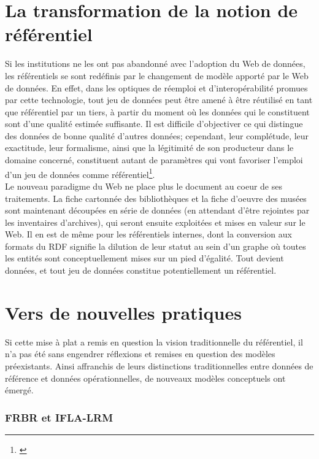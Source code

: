 \documentclass[a4paper,12pt,twoside]{book}
\begin{document}
\section{La transformation de la notion de référentiel}\label{transfo-referentiel}

Si les institutions ne les ont pas abandonné avec l'adoption du Web de données, les \og référentiels \fg{} se sont redéfinis par le changement de modèle apporté par le Web de données. En effet, dans les optiques de réemploi et d'interopérabilité promues par cette technologie, tout jeu de données peut être amené à être réutilisé en tant que référentiel par un tiers, à partir du moment où les données qui le constituent sont d'une qualité estimée suffisante. Il est difficile d'objectiver ce qui distingue des \og données de bonne qualité \fg{} d'autres données; cependant, leur complétude, leur exactitude, leur formalisme, ainsi que la légitimité de son producteur dans le domaine concerné, constituent autant de paramètres qui vont favoriser l'emploi d'un jeu de données comme référentiel\footnote{\cite[p.~43]{bermesWebSemantiqueBibliotheque2013}}.\\

Le nouveau paradigme du Web ne place plus le document au coeur de ses traitements. La fiche cartonnée des bibliothèques et la fiche d'oeuvre des musées sont maintenant découpées en série de données (en attendant d'être rejointes par les inventaires d'archives), qui seront ensuite exploitées et mises en valeur sur le Web. Il en est de même pour les référentiels internes, dont la conversion aux formats du RDF signifie la dilution de leur statut au sein d'un graphe où toutes les entités sont conceptuellement mises sur un pied d'égalité. Tout devient données, et tout jeu de données constitue potentiellement un référentiel.


\section{Vers de nouvelles pratiques}
Si cette mise à plat a remis en question la vision traditionnelle du référentiel, il n'a pas été sans engendrer réflexions et remises en question des modèles préexistants. Ainsi affranchis de leurs distinctions traditionnelles entre données de référence et données opérationnelles, de nouveaux modèles conceptuels ont émergé.\\

\subsubsection{FRBR et IFLA-LRM}
\end{document}
